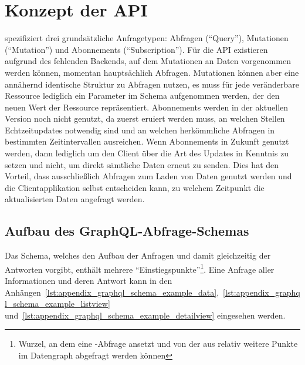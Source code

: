 \section{Konzept der API}
 spezifiziert drei grundsätzliche Anfragetypen: Abfragen (\enquote{Query}), Mutationen (\enquote{Mutation}) und Abonnements (\enquote{Subscription}). Für die API existieren aufgrund des fehlenden Backends, auf dem Mutationen an Daten vorgenommen werden können, momentan hauptsächlich Abfragen. Mutationen können aber eine annähernd identische Struktur zu Abfragen nutzen, es muss für jede veränderbare Ressource lediglich ein Parameter im Schema aufgenommen werden, der den neuen Wert der Ressource repräsentiert. Abonnements werden in der aktuellen Version noch nicht genutzt, da zuerst eruiert werden muss, an welchen Stellen Echtzeitupdates notwendig sind und an welchen herkömmliche Abfragen in bestimmten Zeitintervallen ausreichen. Wenn Abonnements in Zukunft genutzt werden, dann lediglich um den Client über die Art des Updates in Kenntnis zu setzen und nicht, um direkt sämtliche Daten erneut zu senden. Dies hat den Vorteil, dass ausschließlich Abfragen zum Laden von Daten genutzt werden und die Clientapplikation selbst entscheiden kann, zu welchem Zeitpunkt die aktualisierten Daten angefragt werden.

\subsection{Aufbau des GraphQL-Abfrage-Schemas}\label{subsec:graphql_schema}
Das Schema, welches den Aufbau der Anfragen und damit gleichzeitig der Antworten vorgibt, enthält mehrere \enquote{Einstiegspunkte}\footnote{Wurzel, an dem eine -Abfrage ansetzt und von der aus relativ weitere Punkte im Datengraph abgefragt werden können}. Eine Anfrage aller Informationen und deren Antwort kann in den Anhängen~\ref{lst:appendix_graphql_schema_example_data},~\ref{lst:appendix_graphql_schema_example_listview} und~\ref{lst:appendix_graphql_schema_example_detailview} eingesehen werden.

